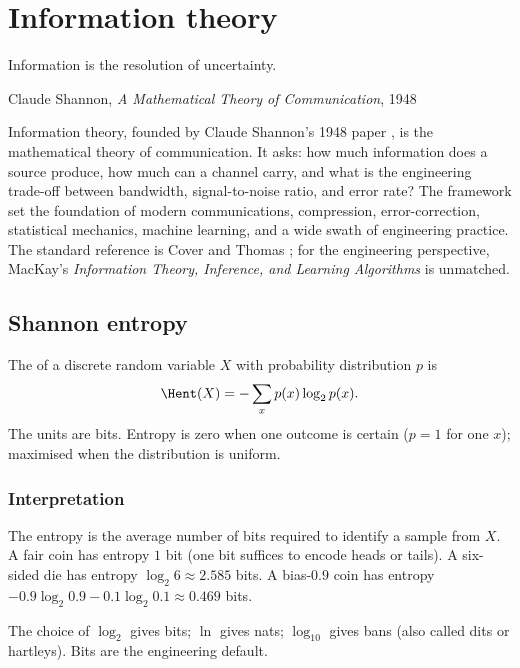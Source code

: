 \chapter{Information theory}
\label{vol07:ch13}

\epigraph{Information is the resolution of uncertainty.}{Claude Shannon, \emph{A Mathematical Theory of Communication}, 1948}


\noindent
Information theory, founded by Claude Shannon's 1948 paper \cite{paper:shannon1948}, is the mathematical theory of communication. It asks: how much information does a source produce, how much can a channel carry, and what is the engineering trade-off between bandwidth, signal-to-noise ratio, and error rate? The framework set the foundation of modern communications, compression, error-correction, statistical mechanics, machine learning, and a wide swath of engineering practice. The standard reference is Cover and Thomas \cite{text:cover-thomas}; for the engineering perspective, MacKay's \emph{Information Theory, Inference, and Learning Algorithms} \cite{gen:mackay2009} is unmatched.

\section{Shannon entropy}

The  of a discrete random variable $X$ with probability distribution $p$ is
\[
\Hent(X) = -\sum_{x} p(x) \log_2 p(x).
\]
The units are bits. Entropy is zero when one outcome is certain ($p = 1$ for one $x$); maximised when the distribution is uniform.

\subsection{Interpretation}

The entropy is the average number of bits required to identify a sample from $X$. A fair coin has entropy $1$ bit (one bit suffices to encode heads or tails). A six-sided die has entropy $\log_2 6 \approx 2.585$ bits. A bias-$0.9$ coin has entropy $-0.9 \log_2 0.9 - 0.1 \log_2 0.1 \approx 0.469$ bits.

The choice of $\log_2$ gives bits; $\ln$ gives nats; $\log_{10}$ gives bans (also called dits or hartleys). Bits are the engineering default.

